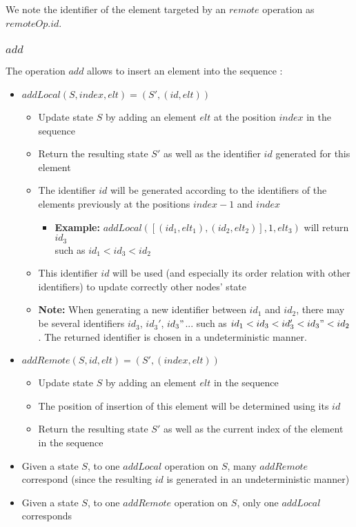 \documentclass[a4paper]{article}
\begin{document}
We note the identifier of the element targeted by an $remote$ operation as $remoteOp.id$.
\subsubsection{$add$}

The operation $add$ allows to insert an element into the sequence :
\begin{itemize}
  \item $addLocal(S, index, elt) = (S', (id, elt))$
  \begin{itemize}
    \item Update state $S$ by adding an element $elt$ at the position $index$ in the sequence
    \item Return the resulting state $S'$ as well as the identifier $id$ generated for this element
    \item The identifier $id$ will be generated according to the identifiers of the elements previously at the positions $index-1$ and $index$
    \begin{itemize}
      \item \textbf{Example: } $addLocal([(id_1, elt_1), (id_2, elt_2)], 1, elt_3)$ will return $id_3$\\ such as $id_1 < id_3 < id_2$
    \end{itemize}
    \item This identifier $id$ will be used (and especially its order relation with other identifiers) to update correctly other nodes' state
    \item \textbf{Note: } When generating a new identifier between $id_1$ and $id_2$,
      there may be several identifiers $id_3$, $id_3'$, $id_3"$... such as
      $id_1 < id_3 < id_3' < id_3" < id_2$. The returned identifier is chosen in a undeterministic manner.
  \end{itemize}
  \item $addRemote(S, id, elt) = (S', (index, elt))$
  \begin{itemize}
    \item Update state $S$ by adding an element $elt$ in the sequence
    \item The position of insertion of this element will be determined using its $id$
    \item Return the resulting state $S'$ as well as the current index of the element in the sequence
  \end{itemize}
  \item Given a state $S$, to one $addLocal$ operation on $S$, many $addRemote$ correspond
    (since the resulting $id$ is generated in an undeterministic manner)
  \item Given a state $S$, to one $addRemote$ operation on $S$, only one $addLocal$ corresponds
\end{itemize}
\end{document}
